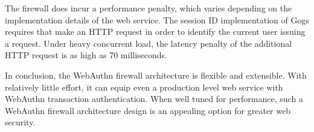 The firewall does incur a performance penalty, which varies depending on the implementation details of the web service. The session ID implementation of Gogs requires that \sys{} make an HTTP request in order to identify the current user issuing a request. Under heavy concurrent load, the latency penalty of the additional HTTP request is as high as 70 milliseconds.

In conclusion, the WebAuthn firewall architecture is flexible and extensible. With relatively little effort, it can equip even a production level web service with WebAuthn transaction authentication. When well tuned for performance, such a WebAuthn firewall architecture design is an appealing option for greater web security.




